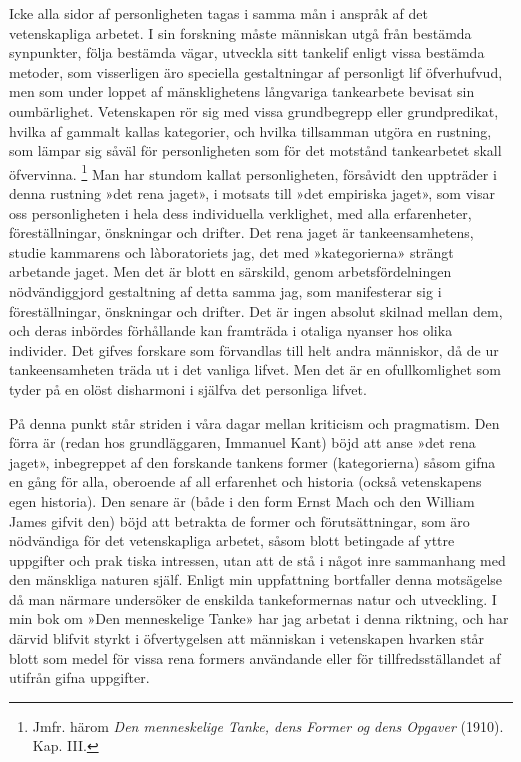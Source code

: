 \documentclass[12pt]{article}
\newcommand{\opage}[1]{\marginnote{\footnotesize\textit{[#1]}}}
\begin{document}
Icke alla sidor af personligheten tagas i samma mån i anspråk af det vetenskapliga arbetet. I sin forskning måste människan utgå från bestämda synpunkter, följa bestämda vägar, utveckla sitt tankelif enligt vissa bestämda metoder, som visserligen äro speciella gestaltningar af personligt lif öfverhufvud, men som under loppet af mänsklighetens långvariga tankearbete bevisat sin oumbärlighet. Vetenskapen rör sig med vissa grundbegrepp eller grundpredikat, hvilka af gammalt kallas kategorier, och hvilka tillsamman utgöra en rustning, som lämpar sig såväl för personligheten som för det motstånd tankearbetet skall öfvervinna.%
\footnote[1]{Jmfr. härom \textit{Den menneskelige Tanke, dens Former og dens Opgaver} (1910). Kap. III.} Man har stundom kallat personligheten, försåvidt den uppträder i denna rustning »det rena jaget», i motsats till »det empiriska jaget», som visar oss personligheten i hela dess individuella verklighet, med alla erfarenheter, föreställningar, önskningar och drifter. Det rena jaget är tankeensamhetens, studie%
\opage{14}
kammarens och làboratoriets %
jag, det med »kategorierna» strängt arbetande jaget. Men det är blott en särskild, genom arbetsfördelningen nödvändiggjord gestaltning af detta samma jag, som manifesterar sig i föreställningar, önskningar och drifter. Det är ingen absolut skilnad mellan dem, och deras inbördes förhållande kan framträda i otaliga nyanser hos olika individer. Det gifves forskare som förvandlas till helt andra människor, då de ur tankeensamheten träda ut i det vanliga lifvet. Men det är en ofullkomlighet som tyder på en olöst disharmoni i själfva det personliga lifvet.

På denna punkt står striden i våra dagar mellan kriticism och pragmatism. Den förra är (redan hos grundläggaren, Immanuel Kant) böjd att anse »det rena jaget», inbegreppet af den forskande tankens former (kategorierna) såsom gifna en gång för alla, oberoende af all erfarenhet och historia (också vetenskapens egen historia). Den senare är (både i den form Ernst Mach och den William James gifvit den) böjd att betrakta de former och förutsättningar, som äro nödvändiga för det vetenskapliga arbetet, såsom blott betingade af yttre uppgifter och prak%
\opage{15}
tiska intressen, utan att de stå i något inre sammanhang med den mänskliga naturen själf. Enligt min uppfattning bortfaller denna motsägelse då man närmare undersöker de enskilda tankeformernas natur och utveckling. I min bok om »Den menneskelige Tanke» har jag arbetat i denna riktning, och har därvid blifvit styrkt i öfvertygelsen att människan i vetenskapen hvarken står blott som medel för vissa rena formers användande eller för tillfredsställandet af utifrån gifna uppgifter.
\end{document}
